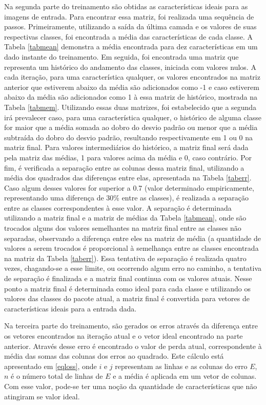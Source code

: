 \documentclass[conference]{IEEEtran}
\begin{document}
Na segunda parte do treinamento são obtidas as características ideais para as imagens de entrada. Para encontrar essa matriz, foi realizada uma sequência de passos. Primeiramente, utilizando a saída da última camada e os valores de suas respectivas classes, foi encontrada a média das características de cada classe. A Tabela \ref{tabmean} demonstra a média encontrada para dez características em um dado instante do treinamento. Em seguida, foi encontrada uma matriz que representa um histórico do andamento das classes, iniciada com valores nulos. A cada iteração, para uma característica qualquer, os valores encontrados na matriz anterior que estiverem abaixo da média são adicionados como -1 e caso estiverem abaixo da média são adicionados como 1 à essa matriz de histórico, mostrada na Tabela \ref{tabmem}. Utilizando essas duas matrizes, foi estabelecido que a segunda irá prevalecer caso, para uma característica qualquer, o histórico de alguma classe for maior que a média somada ao dobro do desvio padrão ou menor que a média subtraída do dobro do desvio padrão, resultando respectivamente em 1 ou 0 na matriz final. Para valores intermediários do histórico, a matriz final será dada pela matriz das médias, 1 para valores acima da média e 0, caso contrário. Por fim, é verificada a separação entre as colunas dessa matriz final, utilizando a média dos quadrados das diferenças entre elas, apresentada na Tabela \ref{taberr}. Caso algum desses valores for superior a 0.7 (valor determinado empiricamente, representando uma diferença de 30\% entre as classes), é realizada a separação entre as classes correspondentes à esse valor. A separação é determinada utilizando a matriz final e a matriz de médias da Tabela \ref{tabmean}, onde são trocados alguns dos valores semelhantes na matriz final entre as classes não separadas, observando a diferença entre eles na matriz de média (a quantidade de valores a serem trocados é proporcional à semelhança entre as classes encontrada na matriz da Tabela \ref{taberr}). Essa tentativa de separação é realizada quatro vezes, chagando-se a esse limite, ou ocorrendo algum erro no caminho, a tentativa de separação é finalizada e a matriz final continua com os valores atuais. Nesse ponto a matriz final é determinada como ideal para cada classe e utilizando os valores das classes do pacote atual, a matriz final é convertida para vetores de características ideais para a entrada dada.

Na terceira parte do treinamento, são gerados os erros através da diferença entre os vetores encontrados na iteração atual e o vetor ideal encontrado na parte anterior. Através desse erro é encontrado o valor de perda atual, correspondente à média das somas das colunas dos erros ao quadrado. Este cálculo está apresentado em \eqref{eqloss}, onde $i$ e $j$ representam as linhas e as colunas do erro $E$, $n$ é o número total de linhas de $E$ e a média é aplicada em um vetor de colunas. Com esse valor, pode-se ter uma noção da quantidade de características que não atingiram se valor ideal.
\end{document}
